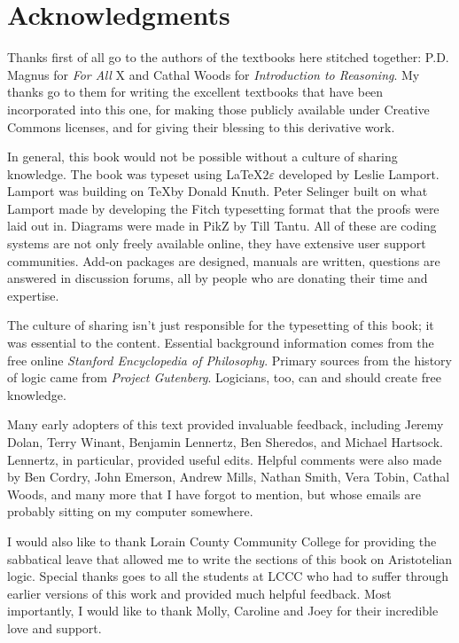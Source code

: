 
\setlength{\parindent}{1em}
\chapter{Acknowledgments}

Thanks first of all go to the authors of the textbooks here stitched together: P.D. Magnus for \emph{For All} X and Cathal Woods for \emph{Introduction to Reasoning}. My thanks go to them for writing the excellent textbooks that have been incorporated into this one, for making those publicly available under Creative Commons licenses, and for giving their blessing to this derivative work. 

In general, this book would not be possible without a culture of sharing knowledge.   The book was typeset using \LaTeX$2\varepsilon$ developed by Leslie Lamport. Lamport was building on \TeX by Donald Knuth. Peter Selinger built on what Lamport made by developing the Fitch typesetting format that the proofs were laid out in. Diagrams were made in PikZ by Till Tantu. All of these are coding systems are not only freely available online, they have extensive user support communities. Add-on packages are designed, manuals are written, questions are answered in discussion forums, all by people who are donating their time and expertise.

The culture of sharing isn't just responsible for the typesetting of this book; it was essential to the content. Essential background information comes from the free online \textit{Stanford Encyclopedia of Philosophy}. Primary sources from the history of logic came from \textit{Project Gutenberg}. Logicians, too, can and should create free knowledge.

Many early adopters of this text provided invaluable feedback, including Jeremy Dolan, Terry Winant, Benjamin Lennertz, Ben Sheredos, and Michael Hartsock. Lennertz, in particular, provided useful edits. Helpful comments were also made by Ben Cordry, John Emerson, Andrew Mills, Nathan Smith, Vera Tobin, Cathal Woods, and many more that I have forgot to mention, but whose emails are probably sitting on my computer somewhere. 

I would also like to thank Lorain County Community College for providing the sabbatical leave that allowed me to write the sections of this book on Aristotelian logic. Special thanks goes to all the students at LCCC who had to suffer through earlier versions of this work and provided much helpful feedback. Most importantly, I would like to thank Molly, Caroline and Joey for their incredible love and support. 

